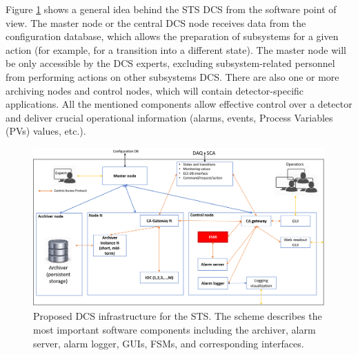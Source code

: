 Figure \ref{fig_arch} shows a general idea behind the \gls{STS} \gls{DCS} from the software point of view.  The master node or the central \gls{DCS} node receives data from the configuration database, which allows the preparation of subsystems for a given action (for example, for a transition into a different state). The master node will be only accessible by the \gls{DCS} experts, excluding subsystem-related personnel from performing actions on other subsystems \gls{DCS}. There are also one or more archiving nodes and control nodes, which will contain detector-specific applications. All the mentioned components allow effective control over a detector and deliver crucial operational information (alarms, events, Process Variables (\glspl{PV}) values, etc.). 

\begin{figure}[!h]
\centering
\includegraphics[width=1\columnwidth]{Chapter3/Controls/images/DCS.png}
\caption{Proposed \gls{DCS} infrastructure for the \gls{STS}. The scheme describes the most important software components including the archiver, alarm server, alarm logger, GUIs, \glspl{FSM}, and corresponding interfaces.}
\label{fig_arch}
\end{figure}
\newpage






